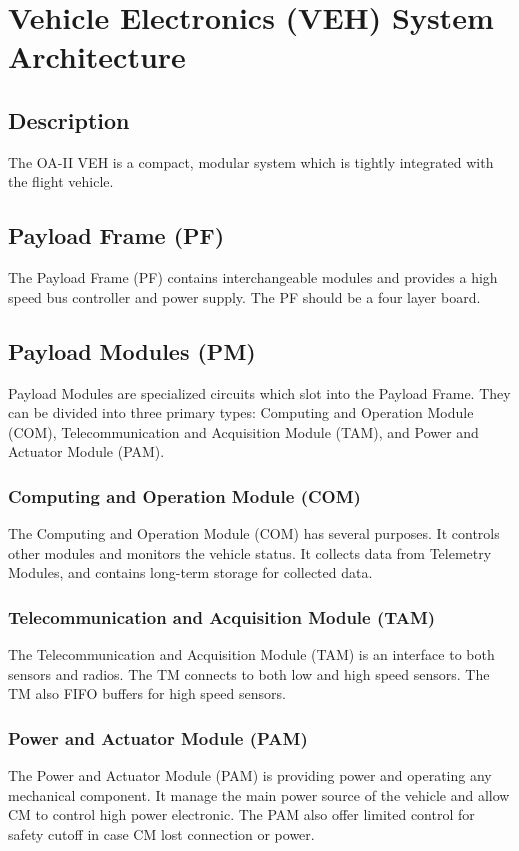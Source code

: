 \documentclass[12pt,article]{memoir}
\begin{document}
\clearpage

\chapter{Vehicle Electronics (VEH) System Architecture}
\section{Description}
The OA-II VEH is a compact, modular system which is tightly integrated with the flight vehicle.
\section{Payload Frame (PF)}
The Payload Frame (PF) contains interchangeable modules and provides a high speed bus controller and power supply. The PF should be a four layer board.
\section{Payload Modules (PM)}
Payload Modules are specialized circuits which slot into the Payload Frame. They can be divided into three primary types: Computing and Operation Module (COM), Telecommunication and Acquisition Module (TAM), and Power and Actuator Module (PAM).
\subsection{Computing and Operation Module (COM)}
The Computing and Operation Module (COM) has several purposes. It controls other modules and monitors the vehicle status. It collects data from Telemetry Modules, and contains long-term storage for collected data. 
\subsection{Telecommunication and Acquisition Module (TAM)}
The Telecommunication and Acquisition Module (TAM) is an interface to both sensors and radios. The TM connects to both low and high speed sensors. The TM also FIFO buffers for high speed sensors.
\subsection{Power and Actuator Module (PAM)}%
The Power and Actuator Module (PAM) is providing power and operating any mechanical component. It manage the main power source of the vehicle and allow CM to control high power electronic. The PAM also offer limited control for safety cutoff in case CM lost connection or power.
\end{document}
